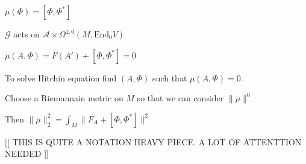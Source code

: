$ \mu(\Phi ) = [ \Phi , \Phi ^* ] $ 

$ \mathcal{G} $ acts on $ \mathcal{A} \times \Omega^{1,0} (M , \mathrm{End}_0 V ) $ 

$ \mu( A, \Phi) = F ( A') + [\Phi , \Phi ^* ] = 0 $ 

To solve Hitchin equation find $(A, \Phi) $ such that $ \mu( A, \Phi) = 0 $. 

Choose a Riemannain metric on $M$ so that we can consider $ \| \mu \| ^0 $ 

Then $ \| \mu \|_2 ^ 2 = \int _M \| F_A + [\Phi , \Phi^* ] \| ^2 $ 




[[ THIS IS QUITE A NOTATION HEAVY PIECE. A LOT OF ATTENTTION NEEDED ]] 







 


